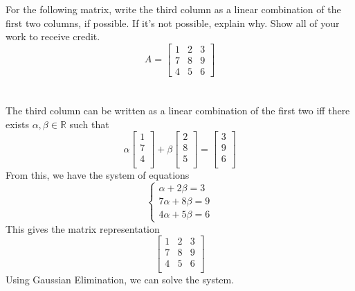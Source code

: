 \documentclass{article}
\begin{document}
\newpage
{} For the following  matrix,  write the third column as a linear combination of the first two columns, if possible.   If it's not possible, explain why. Show all of your work to receive credit.
\[ A = \begin{bmatrix}
1 & 2 & 3 \\ 
7 & 8 & 9 \\
4 & 5 & 6 
\end{bmatrix}\]\\
\noindent\makebox[\linewidth]{\rule{\linewidth}{0.4pt}}\\
The third column can be written as a linear combination of the first two iff there exists \(\alpha ,\beta \in\mathbb{R} \) such that 
\[
  \alpha \begin{bmatrix}
     1 \\
     7 \\
     4 \\
  \end{bmatrix}+\beta \begin{bmatrix}
     2 \\
     8 \\
     5 \\
  \end{bmatrix}=\begin{bmatrix}
     3 \\
     9 \\
     6 \\
  \end{bmatrix}
\]
From this, we have the system of equations 
\[
  \left\{\begin{array}{c}
    \alpha +2\beta =3\\
    7\alpha +8\beta =9\\
    4\alpha +5\beta =6
  \end{array}\right.
\]
This gives the matrix representation
\[
  \begin{bmatrix}
    1 & 2 & 3  \\
    7 & 8 & 9  \\
    4 & 5 & 6  \\
  \end{bmatrix}
\]
Using Gaussian Elimination, we can solve the system.
\end{document}
